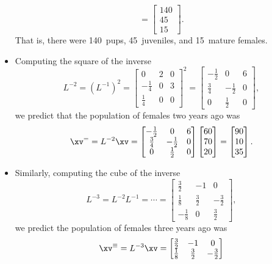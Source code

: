\begin{example}
\begin{solution}
\begin{itemize}
\begin{equation*}
=\begin{bmatrix} 140\\45\\15 \end{bmatrix}.
\end{equation*}
That is, there were 140~pups, 45~juveniles, and 15~mature females.
\item Computing the square of the inverse
\begin{equation*}
L^{-2}=(L^{-1})^2
=\begin{bmatrix} 0&2&0\\-\frac14&0&3\\\frac14&0&0 \end{bmatrix}^2
=\begin{bmatrix} -\frac12&0&6\\
\frac34&-\frac12&0\\
0&\frac12&0 \end{bmatrix},
\end{equation*}
we predict that the population of females two years ago was
\begin{equation*}
\xv^==L^{-2}\xv
=\begin{bmatrix} -\frac12&0&6\\
\frac34&-\frac12&0\\
0&\frac12&0 \end{bmatrix}
\begin{bmatrix} 60\\70\\20 \end{bmatrix}
=\begin{bmatrix} 90\\10\\35 \end{bmatrix}.
\end{equation*}
\item Similarly, computing the cube of the inverse
\begin{equation*}
L^{-3}=L^{-2}L^{-1}=\cdots
=\begin{bmatrix} \frac32&-1&0\\
\frac18&\frac32&-\frac32\\
-\frac18&0&\frac32 \end{bmatrix},
\end{equation*}
we predict the population of females three years ago was
\begin{equation*}
\xv^\equiv=L^{-3}\xv
=\begin{bmatrix} \frac32&-1&0\\
\frac18&\frac32&-\frac32\\

\end{bmatrix}
\end{equation*}
\end{itemize}
\end{solution}
\end{example}
